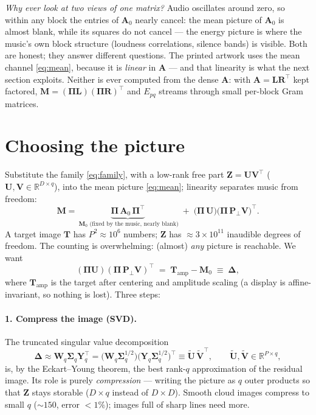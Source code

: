 \documentclass[11pt]{article}
\newcommand{\mA}{\bm{A}}
\newcommand{\mAo}{\bm{A}_0}
\newcommand{\mPp}{\bm{P}_{\!\perp}}
\newcommand{\mZ}{\bm{Z}}
\newcommand{\mU}{\bm{U}}
\newcommand{\mV}{\bm{V}}
\newcommand{\mW}{\bm{W}}
\newcommand{\mY}{\bm{Y}}
\newcommand{\mSig}{\bm{\Sigma}}
\newcommand{\mM}{\bm{M}}
\newcommand{\mT}{\bm{T}}
\newcommand{\mDel}{\bm{\Delta}}
\newcommand{\pool}{\bm{\Pi}}
\newcommand{\R}{\mathbb{R}}
\begin{document}
\emph{Why ever look at two views of one matrix?} Audio oscillates around
zero, so within any block the entries of $\mAo$ nearly cancel: the mean
picture of $\mAo$ is almost blank, while its squares do not cancel --- the
energy picture is where the music's own block structure (loudness
correlations, silence bands) is visible. Both are honest; they answer
different questions. The printed artwork uses the mean channel
\eqref{eq:mean}, because it is \emph{linear} in $\mA$ --- and that
linearity is what the next section exploits. Neither is ever computed from
the dense $\mA$: with $\mA = \bm{L}\bm{R}^\top$ kept factored,
$\mM = (\pool\bm{L})(\pool\bm{R})^\top$ and $E_{pq}$ streams through small
per-block Gram matrices.

\section{Choosing the picture}

Substitute the family \eqref{eq:family}, with a low-rank free part
$\mZ = \mU\mV^\top$ ($\mU,\mV \in \R^{D\times q}$), into the mean picture
\eqref{eq:mean}; linearity separates music from freedom:
\begin{equation}
  \mM
  = \underbrace{\pool\,\mAo\,\pool^\top}_{\ \mM_0 \text{ (fixed by the music, nearly blank)}}
  \;+\; \bigl(\pool\,\mU\bigr)\bigl(\pool\,\mPp\mV\bigr)^{\!\top}.
  \label{eq:Mdecomp}
\end{equation}
A target image $\mT$ has $P^2 \approx 10^6$ numbers; $\mZ$ has
$\approx 3\times10^{11}$ inaudible degrees of freedom. The counting is
overwhelming: (almost) \emph{any} picture is reachable. We want
\begin{equation}
  (\pool\mU)(\pool\,\mPp\mV)^{\!\top}
  \;=\; \mT_{\!\text{amp}} - \mM_0 \;\equiv\; \mDel,
  \label{eq:goal}
\end{equation}
where $\mT_{\!\text{amp}}$ is the target after centering and amplitude
scaling (a display is affine-invariant, so nothing is lost). Three steps:

\paragraph{1. Compress the image (SVD).} The truncated singular value
decomposition
\begin{equation}
  \mDel \approx \mW_{\!q}\mSig_q\mY_{\!q}^{\top}
  = \bigl(\mW_{\!q}\mSig_q^{1/2}\bigr)
    \bigl(\mY_{\!q}\mSig_q^{1/2}\bigr)^{\!\top}
  \equiv \widetilde{\mU}\,\widetilde{\mV}^{\top},
  \qquad \widetilde{\mU}, \widetilde{\mV} \in \R^{P\times q},
\end{equation}
is, by the Eckart--Young theorem, the best rank-$q$ approximation of the
residual image. Its role is purely \emph{compression} --- writing the
picture as $q$ outer products so that $\mZ$ stays storable ($D\times q$
instead of $D\times D$). Smooth cloud images compress to small $q$
($\sim\!150$, error $<1\%$); images full of sharp lines need more.
\end{document}
